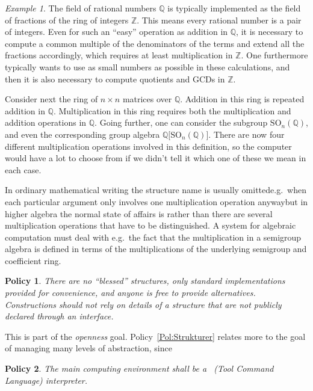 \documentclass{mtmtcl}
\theoremstyle{plain}
\newtheorem{policy}{Policy}
\theoremstyle{remark}
\newtheorem*{example}{Example}
\begin{document}
\begin{example}
  The field of rational numbers $\mathbb{Q}$ is typically implemented 
  as the field of fractions of the ring of integers $\mathbb{Z}$. 
  This means every rational number is a pair of integers. Even for 
  such an ``easy'' operation as addition in $\mathbb{Q}$, it is 
  necessary to compute a common multiple of the denominators of the 
  terms and extend all the fractions accordingly, which requires at 
  least multiplication in $\mathbb{Z}$. One furthermore typically 
  wants to use as small numbers as possible in these calculations, 
  and then it is also necessary to compute quotients and GCDs in 
  $\mathbb{Z}$.
  
  Consider next the ring of $n \times n$ matrices over $\mathbb{Q}$. 
  Addition in this ring is repeated addition in $\mathbb{Q}$. 
  Multiplication in this ring requires both the multiplication and 
  addition operations in $\mathbb{Q}$. Going further, one can 
  consider the subgroup $\mathrm{SO}_n(\mathbb{Q})$, and even the 
  corresponding group algebra $\mathbb{Q}\bigl[ 
  \mathrm{SO}_n(\mathbb{Q}) \bigr]$. There are now four different 
  multiplication operations involved in this definition, so the 
  computer would have a lot to choose from if we didn't tell it which 
  one of these we mean in each case.
\end{example}

In ordinary mathematical writing the structure name 
is usually omitted\Ldash e.g.~when each particular argument only 
involves one multiplication operation anyway\Rdash but in higher 
algebra the normal state of affairs is rather than there are 
several multiplication operations that have to be distinguished. 
A system for algebraic computation must deal with e.g.~the fact 
that the multiplication in a semigroup algebra is defined in 
terms of the multiplications of the underlying semigroup and 
coefficient ring.

\begin{policy}
  There are no ``blessed'' structures, only standard implementations 
  provided for convenience, and anyone is free to provide 
  alternatives. Constructions should not rely on details of a 
  structure that are not publicly declared through an interface.
\end{policy}

This is part of the \emph{openness} goal. Policy~\ref{Pol:Strukturer} 
relates more to the goal of managing many levels of abstraction, 
since 


\begin{policy}
  The main computing environment shall be a \Tcl~(Tool Command 
  Language) interpreter.
\end{policy}
\end{document}
